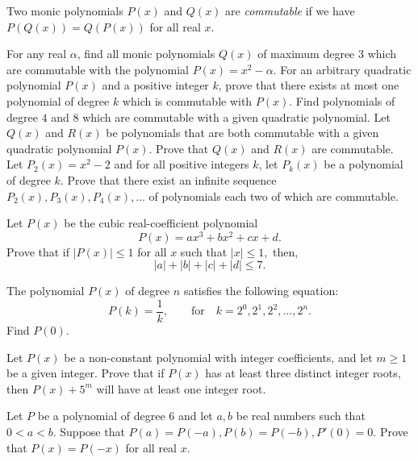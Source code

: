 \documentclass[12pt,a4paper]{memoir}
\theoremstyle{definition}
\begin{document}
\begin{question}[name={1977 USSR}]
	Two monic polynomials $P(x)$ and $Q(x)$ are \textit{commutable} if we have $P(Q(x))=Q(P(x))$ for all real $x$. 
	\begin{tasks}
		\task For any real $\alpha$, find all monic polynomials $Q(x)$ of maximum degree $3$ which are commutable with the polynomial $P(x)=x^2-\alpha$.
		\task For an arbitrary quadratic polynomial $P(x)$ and a positive integer $k$, prove that there exists at most one polynomial of degree $k$ which is commutable with $P(x)$.
		\task Find polynomials of degree $4$ and $8$ which are commutable with a given quadratic polynomial.
		\task Let $Q(x)$ and $R(x)$ be polynomials that are both commutable with a given quadratic polynomial $P(x)$. Prove that $Q(x)$ and $R(x)$ are commutable.
		\task Let $P_2(x)=x^2-2$ and for all positive integers $k$, let $P_k(x)$ be a polynomial of degree $k$. Prove that there exist an infinite sequence $P_2(x), P_3(x), P_4(x),\dots$ of polynomials each two of which are commutable.
	\end{tasks}
\end{question}


\begin{question}[name={1996 IMO Shortlist}]
	Let $P(x)$ be the cubic real-coefficient polynomial \[P(x) = ax^3 + bx^2 + cx + d.\] Prove that if $ |P(x)| \leq 1$ for all $ x$ such that $ |x| \leq 1,$ then, \[ |a| + |b| + |c| + |d| \leq 7.\]
\end{question}


\begin{question}[name={1996 Poland}]
	The polynomial $P(x)$ of degree $n$ satisfies the following equation:
	\[P(k)=\frac{1}{k},\qquad \text{for} \quad k=2^0,2^1,2^2,\dots,2^n.\]
	Find $P(0)$.
\end{question}



\begin{question}[name={1996 Poland}]
	Let $P(x)$ be a non-constant polynomial with integer coefficients, and let $m \geq 1$ be a given integer. Prove that if $P(x)$ has at least three distinct integer roots, then $P(x)+5^m$ will have at least one integer root.
\end{question}

\begin{question}[name={1998 Baltic Way}]
	Let $P$ be a polynomial of degree $6$ and let $a,b$ be real numbers such that $0<a<b$. Suppose that $P(a)=P(-a),P(b)=P(-b),P'(0)=0$. Prove that $P(x)=P(-x)$ for all real $x$.	
\end{question}
\end{document}
